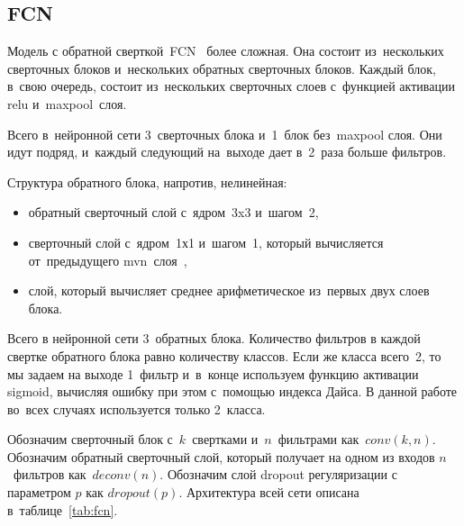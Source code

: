 \subsection{FCN}
 
Модель с обратной сверткой~FCN~\cite{fcn} более сложная. Она состоит из~нескольких сверточных блоков и~нескольких обратных сверточных блоков. Каждый блок, в~свою очередь, состоит из~нескольких сверточных слоев с~функцией активации relu и~maxpool~слоя. 

Всего в~нейронной сети 3~сверточных блока и~1~блок без~maxpool слоя. Они идут подряд, и~каждый следующий на~выходе дает в~2~раза больше фильтров. 

Структура обратного блока, напротив, нелинейная:

\begin{itemize}
  \item обратный сверточный слой с~ядром~3x3 и~шагом~2,
  \item сверточный слой с~ядром~1х1 и~шагом~1, который вычисляется от~предыдущего mvn~слоя~\cite{batch_norm},
  \item слой, который вычисляет среднее арифметическое из~первых двух слоев блока.
\end{itemize}

Всего в нейронной сети 3~обратных блока. Количество фильтров в каждой свертке обратного блока равно количеству классов. Если же класса всего~2, то мы задаем на выходе 1~фильтр и~в~конце используем функцию активации sigmoid, вычисляя ошибку при этом с~помощью индекса Дайса. В данной работе во~всех случаях используется только 2~класса.

Обозначим сверточный блок с~$k$~свертками и~$n$~фильтрами как~$conv(k,n)$. Обозначим обратный сверточный слой, который получает на одном из входов $n$~фильтров как~$deconv(n)$. Обозначим слой dropout регуляризации с параметром $p$ как $dropout(p)$. Архитектура всей сети описана в~таблице~\ref{tab:fcn}.

